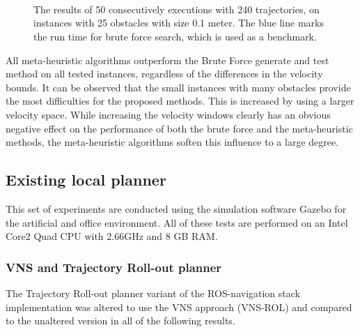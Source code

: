 \begin{figure}[thpb]
   \myfloatalign
    \tiny
          \centering
    \\
    \\
    \\
    {
    \captionsetup[subfigure]{labelformat=empty} 
    }
    \caption[Experiment: Small obstacle instances with different velocity bounds]{The results of 50 consecutively executions with 240 trajectories, on instances with 25 obstacles with size 0.1 meter. The blue line marks the run time for brute force search, which is used as a benchmark.}  
     \label{fig:fig_vel_small}
\end{figure}

All meta-heuristic algorithms outperform the Brute Force generate and test method on all tested instances, regardless of the differences in the velocity bounds.
It can be observed that the small instances with many obstacles provide the most difficulties for the proposed methods.
This is increased by using a larger velocity space.
While increasing the velocity windows clearly has an obvious negative effect on the performance of both the brute force and the meta-heuristic methods, the meta-heuristic algorithms soften this influence to a large degree. 

\subsection{Existing local planner}
This set of experiments are conducted using the simulation software Gazebo for the artificial and office environment. 
All of these tests are performed on an Intel Core2 Quad CPU with 2.66GHz and 8 GB RAM.

\subsubsection{VNS and Trajectory Roll-out planner}
The Trajectory Roll-out planner variant of the ROS-navigation stack implementation was altered to use the VNS approach (VNS-ROL) and compared to the unaltered version in all of the following results.

